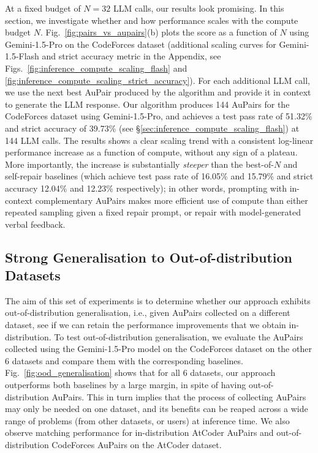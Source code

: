 \documentclass[11pt, a4paper, logo, copyright]{googledeepmind}
\def\aupair/{\textcolor{golden}{Au}Pair}
\def\aupairs/{\textcolor{golden}{Au}Pairs}
\begin{document}
At a fixed budget of $N = 32$ LLM calls, our results look promising. In this section, we investigate whether and how performance scales with the compute budget $N$. Fig.~\ref{fig:pairs_vs_aupairs}(b) plots the score as a function of $N$ using Gemini-1.5-Pro on the CodeForces dataset (additional scaling curves for Gemini-1.5-Flash and strict accuracy metric in the Appendix, see Figs.~\ref{fig:inference_compute_scaling_flash} and \ref{fig:inference_compute_scaling_strict_accuracy}). For each additional LLM call, we use the next best \aupair/ produced by the algorithm and provide it in context to generate the LLM response. Our algorithm produces 144 \aupairs/ for the CodeForces dataset using Gemini-1.5-Pro, and achieves a test pass rate of 51.32\% and strict accuracy of 39.73\% (see \S\ref{sec:inference_compute_scaling_flash}) at 144 LLM calls. The results shows a clear scaling trend with a consistent log-linear performance increase as a function of compute, without any sign of a plateau. More importantly, the increase is substantially \emph{steeper} than the best-of-$N$ and self-repair baselines (which achieve test pass rate of 16.05\% and 15.79\% and strict accuracy 12.04\% and 12.23\% respectively); in other words, prompting with in-context complementary \aupairs/ makes more efficient use of compute than either repeated sampling given a fixed repair prompt, or repair with model-generated verbal feedback.


\subsection{Strong Generalisation to Out-of-distribution Datasets}
\label{sec:OOD}

The aim of this set of experiments is to determine whether our approach exhibits out-of-distribution generalisation, i.e., given \aupairs/ collected on a different dataset, see if we can retain the performance improvements that we obtain in-distribution. To test out-of-distribution generalisation, we evaluate the \aupairs/ collected using the Gemini-1.5-Pro model on the CodeForces dataset on the other 6 datasets and compare them with the corresponding baselines. Fig.~\ref{fig:ood_generalisation} shows that for all 6 datasets, our approach outperforms both baselines by a large margin, in spite of having out-of-distribution \aupairs/. This in turn implies that the process of collecting \aupairs/ may only be needed on one dataset, and its benefits can be reaped across a wide range of problems (from other datasets, or users) at inference time. We also observe matching performance for in-distribution AtCoder \aupairs/ and out-of-distribution CodeForces \aupairs/ on the AtCoder dataset.
\end{document}
